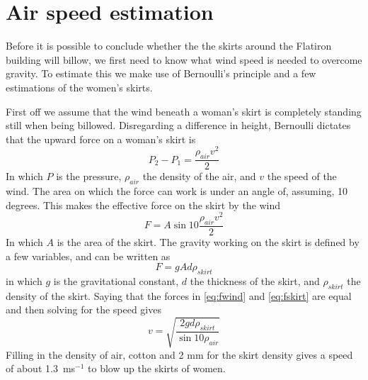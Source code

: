 \clearpage\appendix
\section{Air speed estimation}
\label{airspeedestimation}
Before it is possible to conclude whether the the skirts around the Flatiron building will billow, we first need to know what wind speed is needed to overcome gravity. To estimate this we make use of Bernoulli's principle and a few estimations of the women's skirts.

First off we assume that the wind beneath a woman's skirt is completely standing still when being billowed. Disregarding a difference in height, Bernoulli dictates that the upward force on a woman's skirt is
\begin{equation}
P_2 - P_1 = \frac{\rho_{air}v^2}{2}
\end{equation}
In which $P$ is the pressure, $\rho_{air}$ the density of the air, and $v$ the speed of the wind. The area on which the force can work is under an angle of, assuming, 10 degrees. This makes the effective force on the skirt by the wind
\begin{equation}
F = A \sin{10} \frac{\rho_{air}v^2}{2}
\label{eq:fwind}
\end{equation}
In which $A$ is the area of the skirt. The gravity working on the skirt is defined by a few variables, and can be written as
\begin{equation}
F = g A d \rho_{skirt}
\label{eq:fskirt}
\end{equation}
in which $g$ is the gravitational constant, $d$ the thickness of the skirt, and $\rho_{skirt}$ the density of the skirt. Saying that the forces in \autoref{eq:fwind} and \autoref{eq:fskirt} are equal and then solving for the speed gives
\begin{equation}
v = \sqrt{\frac{2 g d \rho_{skirt}}{\sin{10} \rho_{air}}}
\end{equation}
Filling in the density of air, cotton and 2 mm for the skirt density gives a speed of about 1.3~ms$^{-1}$ to blow up the skirts of women.

